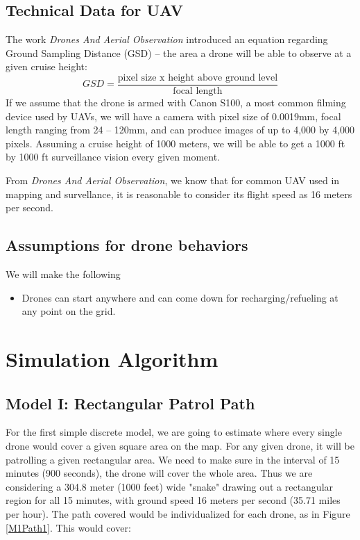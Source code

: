 \documentclass{article}
\begin{document}
\subsection{Technical Data for UAV}
The work \textit{Drones And Aerial Observation} introduced an equation regarding Ground Sampling Distance (GSD) – the area a drone will be able to observe at a given cruise height:
\begin{equation}
GSD = \frac{\text{pixel size x height above ground level}}{\text{focal length}}
\end{equation}
If we assume that the drone is armed with Canon S100, a most common filming device used by UAVs, we will have a camera with pixel size of 0.0019mm, focal length ranging from 24 – 120mm, and can produce images of up to 4,000 by 4,000 pixels. Assuming a cruise height of 1000 meters, we will be able to get a 1000 ft by 1000 ft surveillance vision every given moment.

From \textit{Drones And Aerial Observation}, we know that for common UAV used in mapping and survellance, it is reasonable to consider its flight speed as 16 meters per second.
\subsection{Assumptions for drone behaviors}
We will make the following 
\begin{itemize}
\item Drones can start anywhere and can come down for recharging/refueling at any point on the grid. 
\end{itemize}
\section {Simulation Algorithm}

\subsection{Model I: Rectangular Patrol Path}

For the first simple discrete model, we are going to estimate where every single drone would cover a given square area on the map. For any given drone, it will be patrolling a given rectangular area. We need to make sure in the interval of 15 minutes (900 seconds), the drone will cover the whole area. Thus we are considering a 304.8 meter (1000 feet) wide "snake" drawing out a rectangular region for all 15 minutes, with ground speed 16 meters per second (35.71 miles per hour). The path covered would be individualized for each drone, as in Figure \ref{M1Path1}. This would cover:
\end{document}
